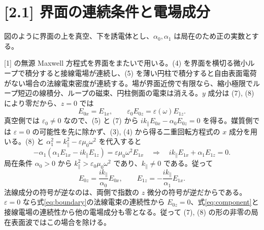 \documentclass[11pt,a4paper]{article}
\begin{document}
\section*{[2.1] 界面の連続条件と電場成分}
図のように界面の上を真空、下を誘電体とし、$\alpha_0,\alpha_1$ は局在のため正の実数とする。
\begin{center}
\end{center}
\newpage
\enlargethispage{3\baselineskip}
[1] の無源 Maxwell 方程式を界面をまたいで用いる。(4) を界面を横切る微小ループで積分すると接線電場が連続し、(5) を薄い円柱で積分すると自由表面電荷がない場合の法線電束密度が連続する。場が界面近傍で有限なら、縮小極限でループ短辺の線積分、ループの磁束、円柱側面の電束は消える。$y$ 成分は (7), (8) により零だから、$z=0$ では
\begin{equation}
\boxed{E_{0x}=E_{1x}},\qquad
\boxed{\varepsilon_0E_{0z}=\varepsilon(\omega)E_{1z}}.
\label{eq:boundary}
\end{equation}
真空側では $\varepsilon_0\ne0$ なので、(5) と (7) から $ik_{\parallel}E_{0x}-\alpha_0E_{0z}=0$ を得る。媒質側では $\varepsilon=0$ の可能性を先に除かず、(3), (4) から得る二重回転方程式の $x$ 成分を用いる。(8) と $\alpha_1^2=k_{\parallel}^2-\varepsilon\mu_0\omega^2$ を代入すると
\begin{equation}
-\alpha_1(\alpha_1E_{1x}-ik_{\parallel}E_{1z})
=\varepsilon\mu_0\omega^2E_{1x}
\quad\Longrightarrow\quad
ik_{\parallel}E_{1x}+\alpha_1E_{1z}=0.
\end{equation}
局在条件 $\alpha_0>0$ から $k_{\parallel}^2>\varepsilon_0\mu_0\omega^2$ であり、$k_{\parallel}\ne0$ である。従って
\begin{equation}
\boxed{E_{0z}=\frac{ik_{\parallel}}{\alpha_0}E_{0x}},\qquad
\boxed{E_{1z}=-\frac{ik_{\parallel}}{\alpha_1}E_{1x}}.
\label{eq:component}
\end{equation}
法線成分の符号が逆なのは、両側で指数の $z$ 微分の符号が逆だからである。
$\varepsilon=0$ なら式\eqref{eq:boundary}の法線電束の連続性から $E_{0z}=0$、式\eqref{eq:component}と接線電場の連続性から他の電場成分も零となる。従って (7), (8) の形の非零の局在表面波ではこの場合を除ける。
\end{document}
